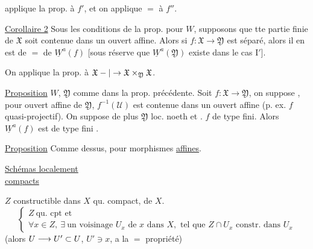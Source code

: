 applique la prop. à $f'$, et on applique $=$ à $f''$.

 \uline{Corollaire 2}
Sous les conditions de la prop. pour $W$,
 supposons que
tte partie finie de $\mathfrak X$ soit contenue dans un ouvert affine.
Alors si $f:\mathfrak X\to\mathfrak Y$ est séparé, alors il en est
de $=$ de $\underline W^a(f)$ [sous réserve que
$\underline W^a(\mathfrak Y)$ existe dans le cas $\mathrm I'$].

On applique la prop. à $\mathfrak X-|\to\mathfrak X\times_{\mathfrak Y}\mathfrak X$.

\uline{Proposition} $W$, $\mathfrak Y$ comme dans la prop. précédente.
Soit $f:\mathfrak X\to\mathfrak Y$, on suppose
, pour  ouvert affine
 de $\mathfrak Y$,
 $f^{-1}(\mathcal U)$ est
 contenue dans un ouvert affine
(p. ex. $f$ quasi-projectif).
On suppose de plus $\mathfrak Y$ loc. noeth et .
$f$ de type fini. 
Alors $\underline W^a(f)$ est de type fini
.

\uline{Proposition} Comme dessus, pour morphismes \uline{affines}.


\uline{Schémas localement}\\
\uline{compacts}

$Z$ constructible dans $X$ qu. compact,
    de  $X$.
\[
\left\{\begin{array}{l}
Z\ \text{qu. cpt et}\\
\forall x\in Z,\ \exists\ \text{un voisinage }U_x\text{ de }x\text{ dans }X,
\text{ tel que }Z\cap U_x\text{ constr. dans }U_x
\end{array}\right.
\]
(alors $U\longrightarrow U'\subset U$, $U'\ni x$, a la $=$ propriété)

